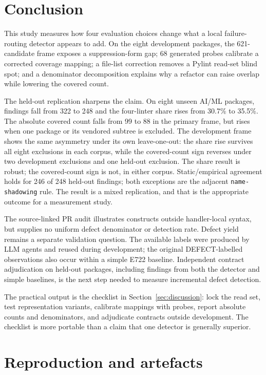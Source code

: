 \documentclass[10pt,a4paper]{article}
\begin{document}
\section{Conclusion}

This study measures how four evaluation choices change what a local
failure-routing detector appears to add. On the eight development packages,
the 621-candidate frame exposes a suppression-form gap; 68 generated probes
calibrate a corrected coverage mapping; a file-list correction removes a
Pylint read-set blind spot; and a denominator decomposition explains why a
refactor can raise overlap while lowering the covered count.

The held-out replication sharpens the claim. On eight unseen AI/ML packages,
findings fall from 322 to 248 and the four-linter share rises from 30.7\% to
35.5\%. The absolute covered count falls from 99 to 88 in the primary frame,
but rises when one package or its vendored subtree is excluded. The
development frame shows the same asymmetry under its own leave-one-out: the
share rise survives all eight exclusions in each corpus, while the
covered-count sign reverses under two development exclusions and one
held-out exclusion. The share result is robust; the covered-count sign is
not, in either corpus. Static/empirical agreement holds for 246 of 248
held-out findings; both exceptions are the adjacent \texttt{name-shadowing}
rule. The result is a mixed replication, and that is the appropriate outcome
for a measurement study.

The source-linked PR audit illustrates constructs outside handler-local
syntax, but supplies no uniform defect denominator or detection rate.
Defect yield remains a separate validation question. The available labels were produced by LLM agents
and reused during development; the original DEFECT-labelled observations also
occur within a simple E722 baseline. Independent contract adjudication on
held-out packages, including findings from both the detector and simple
baselines, is the next step needed to measure incremental defect detection.

The practical output is the checklist in Section~\ref{sec:discussion}: lock
the read set, test representation variants, calibrate mappings with probes,
report absolute counts and denominators, and adjudicate contracts outside
development. The checklist is more portable than a claim that one detector is
generally superior.

\appendix
\section{Reproduction and artefacts}
\label{sec:repro}
\end{document}
